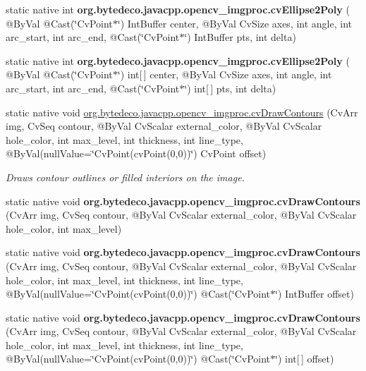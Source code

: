 \begin{DoxyCompactItemize}
static native int {\bfseries org.\+bytedeco.\+javacpp.\+opencv\+\_\+imgproc.\+cv\+Ellipse2\+Poly} ( @By\+Val @Cast(\char`\"{}Cv\+Point$\ast$\char`\"{}) Int\+Buffer center, @By\+Val Cv\+Size axes, int angle, int arc\+\_\+start, int arc\+\_\+end, @Cast(\char`\"{}Cv\+Point$\ast$\char`\"{}) Int\+Buffer pts, int delta)
\item 
\mbox{\label{group__imgproc__c_gab6478eae05a1f206e0458241a22caecb}} 
static native int {\bfseries org.\+bytedeco.\+javacpp.\+opencv\+\_\+imgproc.\+cv\+Ellipse2\+Poly} ( @By\+Val @Cast(\char`\"{}Cv\+Point$\ast$\char`\"{}) int\mbox{[}$\,$\mbox{]} center, @By\+Val Cv\+Size axes, int angle, int arc\+\_\+start, int arc\+\_\+end, @Cast(\char`\"{}Cv\+Point$\ast$\char`\"{}) int\mbox{[}$\,$\mbox{]} pts, int delta)
\item 
static native void \hyperlink{group__imgproc__c_ga225fad4fc8d41e9c4235b5b6e11de7c9}{org.\+bytedeco.\+javacpp.\+opencv\+\_\+imgproc.\+cv\+Draw\+Contours} (Cv\+Arr img, Cv\+Seq contour, @By\+Val Cv\+Scalar external\+\_\+color, @By\+Val Cv\+Scalar hole\+\_\+color, int max\+\_\+level, int thickness, int line\+\_\+type, @By\+Val(null\+Value=\char`\"{}Cv\+Point(cv\+Point(0,0))\char`\"{}) Cv\+Point offset)
\begin{DoxyCompactList}\small\item\em Draws contour outlines or filled interiors on the image. \end{DoxyCompactList}\item 
\mbox{\label{group__imgproc__c_gafbc9f12216854f56b55028b45522b928}} 
static native void {\bfseries org.\+bytedeco.\+javacpp.\+opencv\+\_\+imgproc.\+cv\+Draw\+Contours} (Cv\+Arr img, Cv\+Seq contour, @By\+Val Cv\+Scalar external\+\_\+color, @By\+Val Cv\+Scalar hole\+\_\+color, int max\+\_\+level)
\item 
\mbox{\label{group__imgproc__c_ga797bdb3aa06c72828c9f933faa248f80}} 
static native void {\bfseries org.\+bytedeco.\+javacpp.\+opencv\+\_\+imgproc.\+cv\+Draw\+Contours} (Cv\+Arr img, Cv\+Seq contour, @By\+Val Cv\+Scalar external\+\_\+color, @By\+Val Cv\+Scalar hole\+\_\+color, int max\+\_\+level, int thickness, int line\+\_\+type, @By\+Val(null\+Value=\char`\"{}Cv\+Point(cv\+Point(0,0))\char`\"{}) @Cast(\char`\"{}Cv\+Point$\ast$\char`\"{}) Int\+Buffer offset)
\item 
\mbox{\label{group__imgproc__c_ga013953d4d8afb4566966c9b8e6eaa57f}} 
static native void {\bfseries org.\+bytedeco.\+javacpp.\+opencv\+\_\+imgproc.\+cv\+Draw\+Contours} (Cv\+Arr img, Cv\+Seq contour, @By\+Val Cv\+Scalar external\+\_\+color, @By\+Val Cv\+Scalar hole\+\_\+color, int max\+\_\+level, int thickness, int line\+\_\+type, @By\+Val(null\+Value=\char`\"{}Cv\+Point(cv\+Point(0,0))\char`\"{}) @Cast(\char`\"{}Cv\+Point$\ast$\char`\"{}) int\mbox{[}$\,$\mbox{]} offset)
\end{DoxyCompactItemize}
